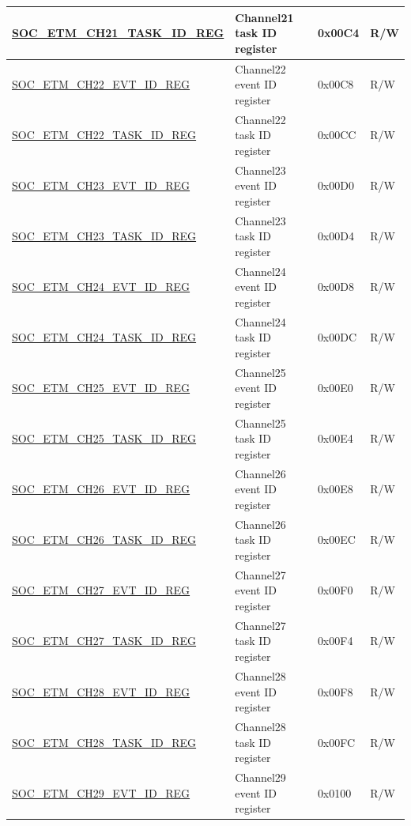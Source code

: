 \begin{longtable}{ | p{6cm} | p{6.4cm} | p{1.3cm} | p{1.8cm} | }
\hyperref[regdesc:SOCETMCH0TASKIDREG]{SOC\_ETM\_CH21\_TASK\_ID\_REG} & Channel21 task ID register & 0x00C4 & R/W \\ \hline
\hyperref[regdesc:SOCETMCH0EVTIDREG]{SOC\_ETM\_CH22\_EVT\_ID\_REG} & Channel22 event ID register & 0x00C8 & R/W \\ \hline
\hyperref[regdesc:SOCETMCH0TASKIDREG]{SOC\_ETM\_CH22\_TASK\_ID\_REG} & Channel22 task ID register & 0x00CC & R/W \\ \hline
\hyperref[regdesc:SOCETMCH0EVTIDREG]{SOC\_ETM\_CH23\_EVT\_ID\_REG} & Channel23 event ID register & 0x00D0 & R/W \\ \hline
\hyperref[regdesc:SOCETMCH0TASKIDREG]{SOC\_ETM\_CH23\_TASK\_ID\_REG} & Channel23 task ID register & 0x00D4 & R/W \\ \hline
\hyperref[regdesc:SOCETMCH0EVTIDREG]{SOC\_ETM\_CH24\_EVT\_ID\_REG} & Channel24 event ID register & 0x00D8 & R/W \\ \hline
\hyperref[regdesc:SOCETMCH0TASKIDREG]{SOC\_ETM\_CH24\_TASK\_ID\_REG} & Channel24 task ID register & 0x00DC & R/W \\ \hline
\hyperref[regdesc:SOCETMCH0EVTIDREG]{SOC\_ETM\_CH25\_EVT\_ID\_REG} & Channel25 event ID register & 0x00E0 & R/W \\ \hline
\hyperref[regdesc:SOCETMCH0TASKIDREG]{SOC\_ETM\_CH25\_TASK\_ID\_REG} & Channel25 task ID register & 0x00E4 & R/W \\ \hline
\hyperref[regdesc:SOCETMCH0EVTIDREG]{SOC\_ETM\_CH26\_EVT\_ID\_REG} & Channel26 event ID register & 0x00E8 & R/W \\ \hline
\hyperref[regdesc:SOCETMCH0TASKIDREG]{SOC\_ETM\_CH26\_TASK\_ID\_REG} & Channel26 task ID register & 0x00EC & R/W \\ \hline
\hyperref[regdesc:SOCETMCH0EVTIDREG]{SOC\_ETM\_CH27\_EVT\_ID\_REG} & Channel27 event ID register & 0x00F0 & R/W \\ \hline
\hyperref[regdesc:SOCETMCH0TASKIDREG]{SOC\_ETM\_CH27\_TASK\_ID\_REG} & Channel27 task ID register & 0x00F4 & R/W \\ \hline
\hyperref[regdesc:SOCETMCH0EVTIDREG]{SOC\_ETM\_CH28\_EVT\_ID\_REG} & Channel28 event ID register & 0x00F8 & R/W \\ \hline
\hyperref[regdesc:SOCETMCH0TASKIDREG]{SOC\_ETM\_CH28\_TASK\_ID\_REG} & Channel28 task ID register & 0x00FC & R/W \\ \hline
\hyperref[regdesc:SOCETMCH0EVTIDREG]{SOC\_ETM\_CH29\_EVT\_ID\_REG} & Channel29 event ID register & 0x0100 & R/W \\ \hline

\end{longtable}
